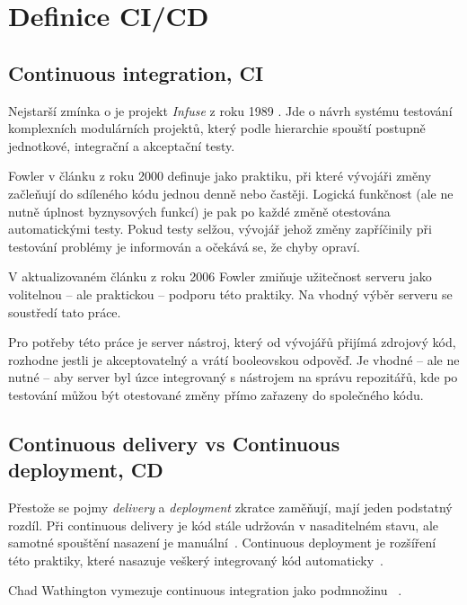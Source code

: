     \section*{Definice CI/CD}
        \subsection*{Continuous integration, CI}
            Nejstarší zmínka o \CI je projekt \textit{Infuse} z roku 1989 \cite{kaiser-infuse}. Jde o návrh systému testování komplexních modulárních projektů, který podle hierarchie spouští postupně jednotkové, integrační a akceptační testy.

            Fowler v článku z roku 2000 \cite{fowler-ci-original} definuje \CI jako praktiku, při které vývojáři změny začleňují do sdíleného kódu jednou denně nebo častěji. Logická funkčnost (ale ne nutně úplnost byznysových funkcí) je pak po každé změně otestována automatickými testy. Pokud testy selžou, vývojář jehož změny zapříčinily při testování problémy je informován a očekává se, že chyby opraví.

            V aktualizovaném článku z roku 2006 Fowler \cite{fowler-ci} zmiňuje užitečnost \CI serveru jako volitelnou -- ale praktickou -- podporu této praktiky. Na vhodný výběr \CI serveru se soustředí tato práce.

            Pro potřeby této práce je \CI server nástroj, který od vývojářů přijímá zdrojový kód, rozhodne jestli je akceptovatelný a vrátí booleovskou odpověď. Je vhodné -- ale ne nutné -- aby \CI server byl úzce integrovaný s nástrojem na správu repozitářů, kde po testování můžou být otestované změny přímo zařazeny do společného kódu.

        \subsection*{Continuous delivery vs Continuous deployment, CD}
            Přestože se pojmy \textit{delivery} a \textit{deployment} zkratce \CD zaměňují, mají jeden podstatný rozdíl. Při continuous delivery je kód stále udržován v nasaditelném stavu, ale samotné spouštění nasazení je manuální~\cite{cd-delivery}. Continuous deployment je rozšíření této praktiky, které nasazuje veškerý integrovaný kód automaticky~\cite{cd-versus}.

            Chad Wathington vymezuje continuous integration jako podmnožinu \CD~\cite{fowler-go}.

